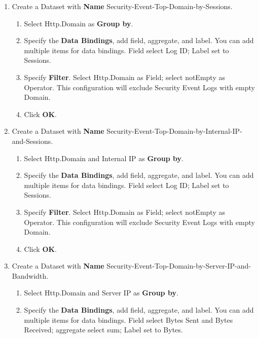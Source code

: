 \begin{description}
\begin{enumerate}
\begin{enumerate}
\begin{enumerate}
                \item	Field select Log ID; Label set to Sessions.
            \end{enumerate}
            \item	Click \textbf{OK}.
        \end{enumerate}
        \item Create a Dataset with \textbf{Name} Security-Event-Top-Domain-by-Sessions.
        \begin{enumerate}
            \item	Select Http.Domain as \textbf{Group by}. 
            \item	Specify the \textbf{Data Bindings}, add field, aggregate, and label. You can add multiple items for data bindings. Field select Log ID; Label set to Sessions.
            \item	Specify \textbf{Filter}. Select Http.Domain as Field; select notEmpty as Operator. This configuration will exclude Security Event Logs with empty Domain.
            \item	Click \textbf{OK}.
        \end{enumerate}
        \item Create a Dataset with \textbf{Name} Security-Event-Top-Domain-by-Internal-IP-and-Sessions.
        \begin{enumerate}
            \item	Select Http.Domain and Internal IP as \textbf{Group by}. 
            \item	Specify the \textbf{Data Bindings}, add field, aggregate, and label. You can add multiple items for data bindings. Field select Log ID; Label set to Sessions.
            \item	Specify \textbf{Filter}. Select Http.Domain as Field; select notEmpty as Operator. This configuration will exclude Security Event Logs with empty Domain.
            \item	Click \textbf{OK}.
        \end{enumerate}
        \item Create a Dataset with \textbf{Name} Security-Event-Top-Domain-by-Server-IP-and-Bandwidth.
        \begin{enumerate}
            \item	Select Http.Domain and Server IP as \textbf{Group by}. 
            \item	Specify the \textbf{Data Bindings}, add field, aggregate, and label. You can add multiple items for data bindings. Field select Bytes Sent and Bytes Received; aggregate select sum; Label set to Bytes.

\end{enumerate}
\end{enumerate}
\end{description}
